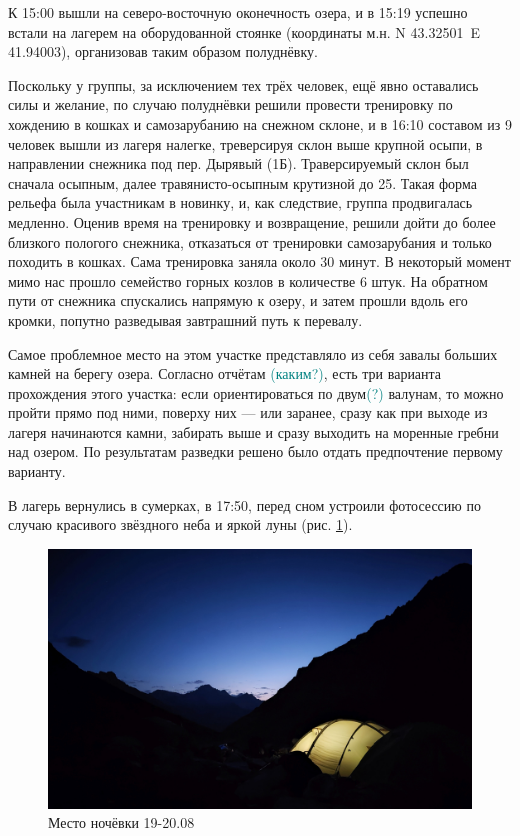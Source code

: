 К 15:00 вышли на северо-восточную оконечность озера, и в 15:19 успешно встали на лагерем на оборудованной стоянке (координаты м.н. N 43.32501\degree~E 41.94003\degree), организовав таким образом полуднёвку.

Поскольку у группы, за исключением тех трёх человек, ещё явно оставались силы и желание, по случаю полуднёвки решили провести тренировку по хождению в кошках и самозарубанию на снежном склоне, и в 16:10 составом из 9 человек вышли из лагеря налегке, треверсируя склон выше крупной осыпи, в направлении снежника под пер. Дырявый (1Б). Траверсируемый склон был сначала осыпным, далее травянисто-осыпным крутизной до 25\degree. Такая форма рельефа была участникам в новинку, и, как следствие, группа продвигалась медленно. Оценив время на тренировку и возвращение, решили дойти до более близкого пологого снежника, отказаться от тренировки самозарубания и только походить в кошках. Сама тренировка заняла около 30 минут. В некоторый момент мимо нас прошло семейство горных козлов в количестве 6 штук.
На обратном пути от снежника спускались напрямую к озеру, и затем прошли вдоль его кромки, попутно разведывая завтрашний путь к перевалу. 

Самое проблемное место на этом участке представляло из себя завалы больших камней на берегу озера. Согласно отчётам \textcolor{teal}{(каким?)}, есть три варианта прохождения этого участка: если ориентироваться по двум\textcolor{teal}{(?)} валунам, то можно пройти прямо под ними, поверху них --- или заранее, сразу как при выходе из лагеря начинаются камни, забирать выше и сразу выходить на моренные гребни над озером. По результатам разведки решено было отдать предпочтение первому варианту.

В лагерь вернулись в сумерках, в 17:50, перед сном устроили фотосессию по случаю красивого звёздного неба и яркой луны (рис. \ref{fig:IMG_20240829_194851}).

\begin{figure}[h!]
	\centering
	\includegraphics[width=0.7\linewidth]{../pics/IMG_20240829_194851}
	\caption{Место ночёвки 19-20.08}
	\label{fig:IMG_20240829_194851}
\end{figure}

\clearpage